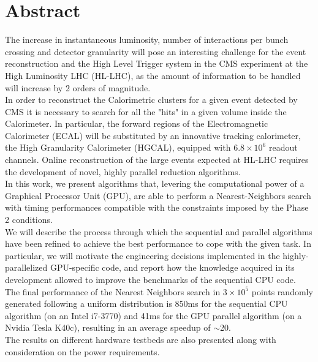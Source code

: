 \chapter*{Abstract}
\thispagestyle{empty}
The increase in instantaneous luminosity, number of interactions per bunch crossing and detector granularity will pose an interesting challenge for the event reconstruction and the High Level Trigger system in the CMS experiment at the High Luminosity LHC (HL-LHC), as the amount of information to be handled will increase by 2 orders of magnitude.\\
In order to reconstruct the Calorimetric clusters for a given event detected by CMS it is necessary to search for all the "hits" in a given volume inside the Calorimeter. In particular, the forward regions of the Electromagnetic Calorimeter (ECAL) will be substituted by an innovative tracking calorimeter, the High Granularity Calorimeter (HGCAL), equipped with $6.8\times10^6$ readout channels. Online reconstruction of the large events expected at HL-LHC requires the development of novel, highly parallel reduction algorithms.\\
In this work, we present algorithms that,  levering the computational power of a Graphical Processor Unit (GPU), are able to perform a Nearest-Neighbors search with timing performances compatible with the constraints imposed by the Phase 2 conditions.\\
We will describe the process through which the sequential and parallel algorithms have been refined to achieve the best performance to cope with the given task. In particular, we will motivate the engineering decisions implemented in the highly-parallelized GPU-specific code, and report how the knowledge acquired in its development allowed to improve the benchmarks of the sequential CPU code.\\
The final performance of the Nearest Neighbors search in $3\times10^5$ points randomly generated following a uniform distribution is 850\unit{ms} for the sequential CPU algorithm (on an Intel i7-3770) and  41\unit{ms} for the GPU parallel algorithm (on a Nvidia Tesla K40c), resulting in an average speedup of $\sim$20.\\
The results on different hardware testbeds are also presented along with consideration on the power requirements.\\

\cleardoublepage

\indici
